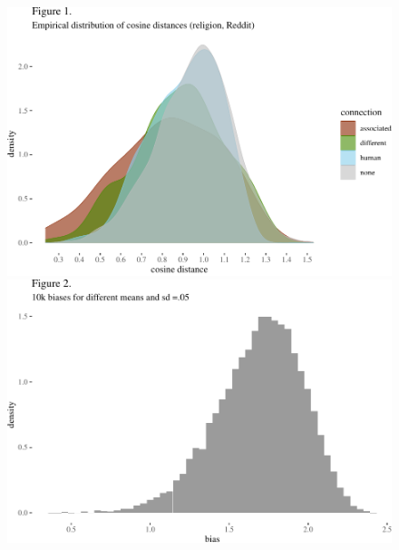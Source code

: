 \documentclass[12pt,dvipsnames,enabledeprecatedfontcommands]{scrartcl}
\begin{document}
\pagebreak

\begin{center}
\begin{figure}[!htb]\centering
   \begin{minipage}{0.48\textwidth}

\begin{center}\includegraphics[width=1\linewidth]{abstractESSLLI1_files/figure-latex/unnamed-chunk-1-1} \end{center}
   \end{minipage}
   \begin {minipage}{0.48\textwidth}

\begin{center}\includegraphics[width=1\linewidth]{abstractESSLLI1_files/figure-latex/unnamed-chunk-2-1} \end{center}
   \end{minipage}
   

\end{figure}
\end{center}
\end{document}

